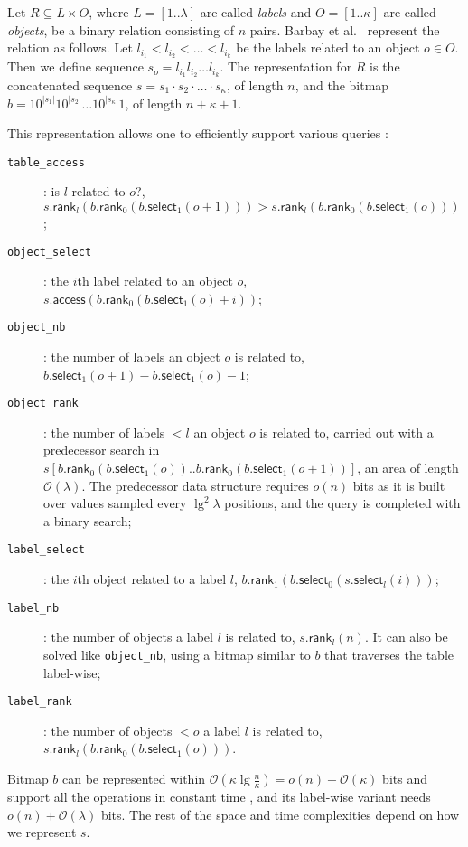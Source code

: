 \documentclass[11pt]{article}
\newcommand{\Oh}[1]
    {\ensuremath{\mathcal{O}\left( {#1} \right)}}
\newcommand{\access}
    {\ensuremath{\mathsf{access}}}
\newcommand{\rank}
    {\ensuremath{\mathsf{rank}}}
\newcommand{\select}
    {\ensuremath{\mathsf{select}}}
\begin{document}
Let $R \subseteq L \times O$, where $L=[1..\lambda]$ are called {\em labels}
and $O=[1..\kappa]$ are called {\em objects}, be a binary relation consisting 
of $n$ pairs. Barbay et al.~\cite{BGMR07} represent the relation as follows. 
Let $l_{i_1} < l_{i_2} < \ldots < l_{i_k}$ be the labels related to an object 
$o\in O$. Then we define sequence $s_o = l_{i_1} l_{i_2} \ldots l_{i_k}$. The 
representation for $R$ is the concatenated sequence 
$s = s_1 \cdot s_2 \cdot \ldots \cdot s_\kappa$, of length $n$, and 
the bitmap $b = 1 0^{|s_1|} 1 0^{|s_2|} \ldots 1 0^{|s_\kappa|} 1$, of length 
$n+\kappa+1$.

This representation allows one to efficiently support various queries 
\cite{BGMR07}:
\begin{description}
\item[{\tt table\_access}]:
is $l$ related to $o$?,
	$s.\rank_l(b.\rank_0(b.\select_1(o+1))) > 
	 s.\rank_l(b.\rank_0(b.\select_1(o)))$;
\item[{\tt object\_select}]:
the $i$th label related to an object $o$, 
	$s.\access(b.\rank_0(b.\select_1(o)+i))$; 
\item[{\tt object\_nb}]:
the number of labels an object $o$ is related to, 
	$b.\select_1(o+1)-b.\select_1(o)-1$; 
\item[{\tt object\_rank}]:
the number of labels $< l$ an object $o$ is related to,
	carried out with a predecessor search in 
        $s[b.\rank_0(b.\select_1(o))..b.\rank_0(b.\select_1(o+1))]$, an
        area of length $\Oh{\lambda}$.
	The predecessor data structure requires $o(n)$ bits as it
        is built over values sampled every $\lg^2\lambda$ positions, and the
	query is completed with a binary search;
\item[{\tt label\_select}]:
the $i$th object related to a label $l$, 
	$b.\rank_1(b.\select_0(s.\select_l(i)))$;
\item[{\tt label\_nb}]:
the number of objects a label $l$ is related to,
	$s.\rank_l(n)$. It can also be solved like {\tt object\_nb},
        using a bitmap similar to $b$ that traverses the table label-wise;
\item[{\tt label\_rank}]:
the number of objects $< o$ a label $l$ is related to,
	$s.\rank_l(b.\rank_0(b.\select_1(o)))$. 
\end{description}

Bitmap $b$ can be represented within $\Oh{\kappa\lg\frac{n}{\kappa}} =
o(n) + \Oh{\kappa}$ bits and support all the operations in constant time 
\cite{RRR02}, and its label-wise variant needs $o(n)+\Oh{\lambda}$ bits.
The rest of the space and time complexities depend on how we represent $s$.
\end{document}
